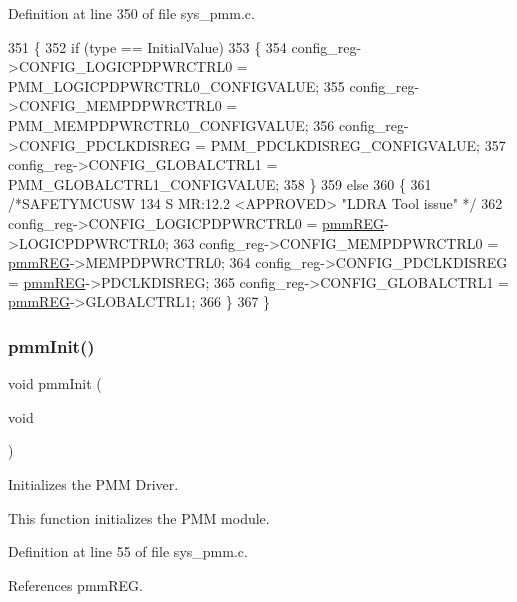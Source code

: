 Definition at line 350 of file sys\+\_\+pmm.\+c.


\begin{DoxyCode}
351 \{
352     \textcolor{keywordflow}{if} (type == InitialValue)
353     \{
354         config\_reg->CONFIG\_LOGICPDPWRCTRL0 = PMM\_LOGICPDPWRCTRL0\_CONFIGVALUE;
355         config\_reg->CONFIG\_MEMPDPWRCTRL0 = PMM\_MEMPDPWRCTRL0\_CONFIGVALUE;
356         config\_reg->CONFIG\_PDCLKDISREG = PMM\_PDCLKDISREG\_CONFIGVALUE;
357         config\_reg->CONFIG\_GLOBALCTRL1 = PMM\_GLOBALCTRL1\_CONFIGVALUE;
358     \}
359     \textcolor{keywordflow}{else}
360     \{
361     \textcolor{comment}{/*SAFETYMCUSW 134 S MR:12.2 <APPROVED> "LDRA Tool issue" */}
362         config\_reg->CONFIG\_LOGICPDPWRCTRL0 = \mbox{\hyperlink{reg__pmm_8h_a57b193bea1bf1951b97bdfee07f48598}{pmmREG}}->LOGICPDPWRCTRL0;
363         config\_reg->CONFIG\_MEMPDPWRCTRL0 = \mbox{\hyperlink{reg__pmm_8h_a57b193bea1bf1951b97bdfee07f48598}{pmmREG}}->MEMPDPWRCTRL0;
364         config\_reg->CONFIG\_PDCLKDISREG = \mbox{\hyperlink{reg__pmm_8h_a57b193bea1bf1951b97bdfee07f48598}{pmmREG}}->PDCLKDISREG;
365         config\_reg->CONFIG\_GLOBALCTRL1 = \mbox{\hyperlink{reg__pmm_8h_a57b193bea1bf1951b97bdfee07f48598}{pmmREG}}->GLOBALCTRL1;
366     \}
367 \}
\end{DoxyCode}
\mbox{\label{group__PMM_ga677f111b8d9604b6ab733f58105a36d8}} 
\subsubsection{\texorpdfstring{pmm\+Init()}{pmmInit()}}
{\footnotesize\ttfamily void pmm\+Init (\begin{DoxyParamCaption}\item[{void}]{ }\end{DoxyParamCaption})}



Initializes the P\+MM Driver. 

This function initializes the P\+MM module. 

Definition at line 55 of file sys\+\_\+pmm.\+c.



References pmm\+R\+EG.


